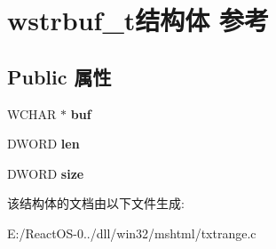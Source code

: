 \hypertarget{structwstrbuf__t}{}\section{wstrbuf\+\_\+t结构体 参考}
\label{structwstrbuf__t}
\subsection*{Public 属性}
\begin{DoxyCompactItemize}
\item 
\mbox{\label{structwstrbuf__t_aecace23c4d56d3d0538b2e01de8c3a90}} 
W\+C\+H\+AR $\ast$ {\bfseries buf}
\item 
\mbox{\label{structwstrbuf__t_a3f130e580d194099cad583e4041f86ae}} 
D\+W\+O\+RD {\bfseries len}
\item 
\mbox{\label{structwstrbuf__t_a2957d8c9ff71a7cf33202ccd005a69d0}} 
D\+W\+O\+RD {\bfseries size}
\end{DoxyCompactItemize}


该结构体的文档由以下文件生成\+:\begin{DoxyCompactItemize}
\item 
E\+:/\+React\+O\+S-\/0../dll/win32/mshtml/txtrange.\+c\end{DoxyCompactItemize}
